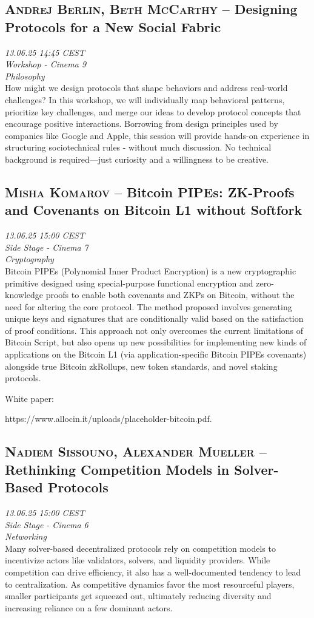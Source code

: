 \clearpage
\subsection {\textsc{Andrej Berlin, Beth McCarthy}  -- Designing Protocols for a New Social Fabric} \noindent \textit {13.06.25 14:45 CEST\\ Workshop - Cinema 9\\ Philosophy}\\[1em] How might we design protocols that shape behaviors and address real-world challenges? In this workshop, we will individually map behavioral patterns, prioritize key challenges, and merge our ideas to develop protocol concepts that encourage positive interactions. Borrowing from design principles used by companies like Google and Apple, this session will provide hands-on experience in structuring sociotechnical rules - without much discussion. No technical background is required—just curiosity and a willingness to be creative.

\clearpage
\subsection {\textsc{Misha Komarov}  -- Bitcoin PIPEs: ZK-Proofs and Covenants on Bitcoin L1 without Softfork} \noindent \textit {13.06.25 15:00 CEST\\ Side Stage - Cinema 7\\ Cryptography}\\[1em] Bitcoin PIPEs (Polynomial Inner Product Encryption) is a new cryptographic primitive designed using special-purpose functional encryption and zero-knowledge proofs to enable both covenants and ZKPs on Bitcoin, without the need for altering the core protocol. The method proposed involves generating unique keys and signatures that are conditionally valid based on the satisfaction of proof conditions. This approach not only overcomes the current limitations of Bitcoin Script, but also opens up new possibilities for implementing new kinds of applications on the Bitcoin L1 (via application-specific Bitcoin PIPEs covenants) alongside true Bitcoin zkRollups, new token standards, and novel staking protocols.

White paper:

https://www.allocin.it/uploads/placeholder-bitcoin.pdf.

\clearpage
\subsection {\textsc{Nadiem Sissouno, Alexander Mueller}  -- Rethinking Competition Models in Solver-Based Protocols} \noindent \textit {13.06.25 15:00 CEST\\ Side Stage - Cinema 6\\ Networking}\\[1em] Many solver-based decentralized protocols rely on competition models to incentivize actors like validators, solvers, and liquidity providers. While competition can drive efficiency, it also has a well-documented tendency to lead to centralization. As competitive dynamics favor the most resourceful players, smaller participants get squeezed out, ultimately reducing diversity and increasing reliance on a few dominant actors.

